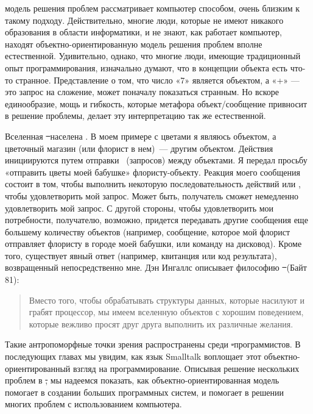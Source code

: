  модель решения проблем рассматривает компьютер
способом, очень близким к такому подходу. Действительно, многие люди, 
которые не имеют никакого образования в области информатики, и не знают, 
как работает компьютер, находят объектно-ориенти\-рован\-ную модель решения 
проблем вполне естественной. Удивительно, однако, что многие люди, 
имеющие традиционный опыт программирования, изначально думают, что в 
концепции объекта есть что-то странное. Представление о том, что число «7» 
является объектом, а «+» --- это запрос на сложение, может поначалу 
показаться странным. Но вскоре единообразие, мощь и гибкость, которые 
метафора объект/сообщение привносит в решение проблемы, делает эту 
интерпретацию так же естественной.

Вселенная \st\ населена . В моем примере с цветами я являюсь объектом, 
а цветочный магазин (или флорист в нем)\ --- другим объектом. Действия 
инициируются путем отправки \ (запросов) между объектами. Я передал 
просьбу «отправить цветы моей бабушке» флористу-объекту. Реакция 
моего сообщения состоит в том, чтобы выполнить некоторую последовательность 
действий или , чтобы удовлетворить мой запрос. Может быть, получатель 
сможет немедленно удовлетворить мой запрос. С другой стороны, чтобы удовлетворить 
мои потребности, получателю, возможно, придется передавать другие сообщения 
еще большему количеству объектов (например, сообщение, которое мой флорист 
отправляет флористу в городе моей бабушки, или команду на дисковод). Кроме 
того, существует явный ответ (например, квитанция или код результата), 
возвращенный непосредственно мне. Дэн Ингаллс описывает философию \st\ (Байт 81):

\begin{quote}
    Вместо того, чтобы обрабатывать структуры данных, которые насилуют и грабят 
    процессор, мы имеем вселенную объектов с хорошим поведением, которые вежливо 
    просят друг друга выполнить их различные желания.
\end{quote}
    
Такие антропоморфные точки зрения распространены среди \st-программистов. 
В последующих главах мы увидим, как язык Smalltalk воплощает этот 
объектно-ориентированный взгляд на программирование. Описывая решение 
нескольких проблем в \st, мы надеемся показать, как объектно-ориентированная 
модель помогает в создании больших программных систем, и помогает в решении 
многих проблем с использованием компьютера.

